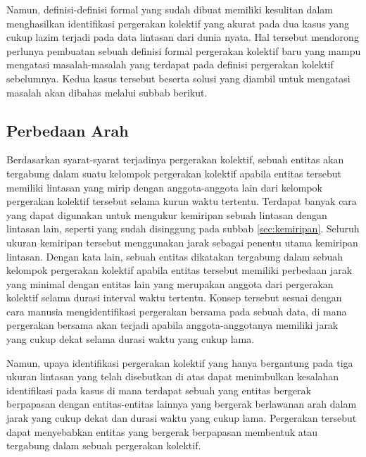 Namun, definisi-definisi formal yang sudah dibuat memiliki
kesulitan dalam menghasilkan identifikasi pergerakan kolektif yang akurat pada dua kasus yang cukup lazim terjadi pada data lintasan dari dunia nyata. Hal tersebut mendorong perlunya pembuatan sebuah definisi formal pergerakan kolektif baru yang mampu mengatasi masalah-masalah yang terdapat pada definisi pergerakan kolektif sebelumnya. Kedua kasus tersebut beserta solusi yang diambil untuk mengatasi masalah akan dibahas melalui subbab berikut.

\subsection{Perbedaan Arah}
\label{subsec:beda-arah}
    
Berdasarkan syarat-syarat terjadinya pergerakan kolektif, sebuah entitas akan tergabung dalam suatu kelompok pergerakan kolektif apabila entitas tersebut memiliki lintasan yang mirip dengan anggota-anggota lain dari kelompok pergerakan kolektif tersebut selama kurun waktu tertentu. Terdapat banyak cara yang dapat digunakan untuk mengukur kemiripan sebuah lintasan dengan lintasan lain, seperti yang sudah disinggung pada subbab \ref{sec:kemiripan}. Seluruh ukuran kemiripan tersebut menggunakan jarak sebagai penentu utama kemiripan lintasan. Dengan kata lain, sebuah entitas dikatakan tergabung dalam sebuah kelompok pergerakan kolektif apabila entitas tersebut memiliki perbedaan jarak yang minimal dengan entitas lain yang merupakan anggota dari pergerakan kolektif selama durasi interval waktu tertentu. Konsep tersebut sesuai dengan cara manusia mengidentifikasi pergerakan bersama pada sebuah data, di mana pergerakan bersama akan terjadi apabila anggota-anggotanya memiliki jarak yang cukup dekat selama durasi waktu yang cukup lama.

Namun, upaya identifikasi pergerakan kolektif yang hanya bergantung pada tiga ukuran lintasan yang telah disebutkan di atas dapat menimbulkan kesalahan identifikasi pada kasus di mana terdapat sebuah yang entitas bergerak berpapasan dengan entitas-entitas lainnya yang bergerak berlawanan arah dalam jarak yang cukup dekat dan durasi waktu yang cukup lama. Pergerakan tersebut dapat menyebabkan entitas yang bergerak berpapasan membentuk atau tergabung dalam sebuah pergerakan kolektif.
    

